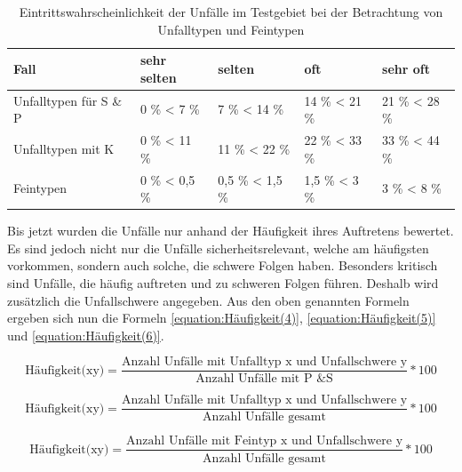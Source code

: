 \begin{table}[htpb]
	\scriptsize
	\caption[Eintrittswahrscheinlichkeit der Unfälle im Testgebiet bei der Betrachtung von Unfalltypen und Feintypen]{Eintrittswahrscheinlichkeit der Unfälle im Testgebiet bei der Betrachtung von Unfalltypen und Feintypen}\label{tab:Haeufigkeits Bereiche}
	\centering
		\begin{tabular}{p{2cm} l l l l}
			\toprule
			Fall & sehr selten & selten & oft & sehr oft \\
			\midrule
			Unfalltypen für S \& P & 0 \% < 7 \%  & 7 \% < 14 \% & 14 \% < 21 \% & 21 \% < 28 \%\\
			Unfalltypen mit K & 0 \% < 11 \%  & 11 \% < 22 \% & 22 \% < 33 \% & 33 \% < 44 \%\\
			Feintypen & 0 \% < 0,5 \% & 0,5 \% < 1,5 \% & 1,5 \% < 3 \% & 3 \% < 8 \%\\
			\bottomrule
		\end{tabular}
\end{table}

Bis jetzt wurden die Unfälle nur anhand der Häufigkeit ihres Auftretens bewertet. Es sind jedoch nicht nur die Unfälle sicherheitsrelevant, welche am häufigsten vorkommen, sondern auch solche, die schwere Folgen haben. Besonders kritisch sind Unfälle, die häufig auftreten und zu schweren Folgen führen. Deshalb wird zusätzlich die Unfallschwere angegeben. Aus den oben genannten Formeln ergeben sich nun die Formeln \ref{equation:Häufigkeit(4)}, \ref{equation:Häufigkeit(5)} und \ref{equation:Häufigkeit(6)}.

\begin{equation}\label{equation:Häufigkeit(4)}
\text{Häufigkeit(xy)} = \dfrac{\text{Anzahl Unfälle mit Unfalltyp x und Unfallschwere y}}{\text{Anzahl Unfälle mit P \& S}}*100
\end{equation}

\begin{equation}\label{equation:Häufigkeit(5)}
\text{Häufigkeit(xy)} = \dfrac{\text{Anzahl Unfälle mit Unfalltyp x und Unfallschwere y}}{\text{Anzahl Unfälle gesamt}}*100
\end{equation}

\begin{equation}\label{equation:Häufigkeit(6)}
\text{Häufigkeit(xy)} = \dfrac{\text{Anzahl Unfälle mit Feintyp x und Unfallschwere y}}{\text{Anzahl Unfälle gesamt}}*100
\end{equation}

